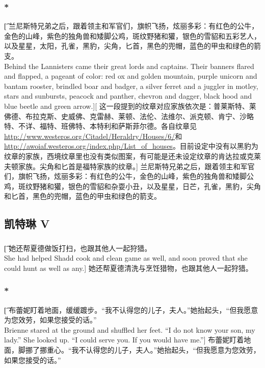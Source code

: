\documentclass[12pt,a4paper]{article}
\begin{document}
\subsubsection{\color{red}*}\t[		
	兰尼斯特兄弟之后，跟着领主和军官们，旗帜飞扬，炫丽多彩：有红色的公牛，金色的山峰，紫色的独角兽和矮脚公鸡，斑纹野猪和獾，银色的雪貂和五彩艺人，以及星星，太阳，孔雀，黑豹，尖角，匕首，黑色的兜帽，蓝色的甲虫和绿色的箭支。\\
	Behind the Lannisters came their great lords and captains. Their banners flared and flapped, a pageant of color: red ox and golden mountain, purple unicorn and bantam rooster, brindled boar and badger, a silver ferret and a juggler in motley, stars and sunbursts, peacock and panther, chevron and dagger, black hood and blue beetle and green arrow.][
	这一段提到的纹章对应家族依次是：普莱斯特、莱佛德、布拉克斯、史威佛、克雷赫、莱顿、法伦、法维尔、派克顿、肯宁、沙略特、不详、福特、班佛特、本特利和萨斯菲尔德。各自纹章见\url{http://www.westeros.org/Citadel/Heraldry/Houses/6/}和\url{http://awoiaf.westeros.org/index.php/List_of_houses}。目前设定中没有以黑豹为纹章的家族，西境纹章里也没有类似图案，有可能是还未设定纹章的肯达拉或克莱夫顿家族。尖角和匕首是福特家族的纹章。]
	兰尼斯特兄弟之后，跟着领主和军官们，旗帜飞扬，炫丽多彩：有红色的公牛，金色的山峰，紫色的独角兽和矮脚公鸡，斑纹野猪和獾，银色的雪貂和杂耍小丑，以及星星，日芒，孔雀，黑豹，尖角和匕首，黑色的兜帽，蓝色的甲虫和绿色的箭支。
	
\subsection{凯特琳 V}
\subsubsection{}\t[	
	她还帮夏德做饭打扫，也跟其他人一起狩猎。\\
	She had helped Shadd cook and clean game as well, and soon proved that she could hunt as well as any.]
	她还帮夏德清洗与烹饪猎物，也跟其他人一起狩猎。

\subsubsection{\color{red}*}\t[	
	布蕾妮盯着地面，缓缓踱步。“我不认得您的儿子，夫人。”她抬起头，“但我愿意为您效劳，如果您接受的话。”\\
	Brienne stared at the ground and shuffled her feet. “I do not know your son, my lady.” She looked up. “I could serve you. If you would have me.”]
	布蕾妮盯着地面，脚挪了挪重心。“我不认得您的儿子，夫人。”她抬起头，“但我愿意为您效劳，如果您接受的话。”
	
\end{document}
